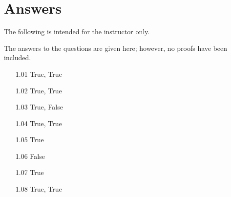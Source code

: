\documentclass{article}
\begin{document}
\newpage

\section*{Answers}

The following is intended for the instructor only.
\vspace{0.5cm}

The answers to the questions are given here; however, no proofs have been included.
\vspace{0.5cm}

\begin{enumerate}
  \item[1.01] True, True
  \item[1.02] True, True
  \item[1.03] True, False
  \item[1.04] True, True
  \item[1.05] True
  \item[1.06] False
  \item[1.07] True
  \item[1.08] True, True
\end{enumerate}
\vspace{0.5cm}
\end{document}

